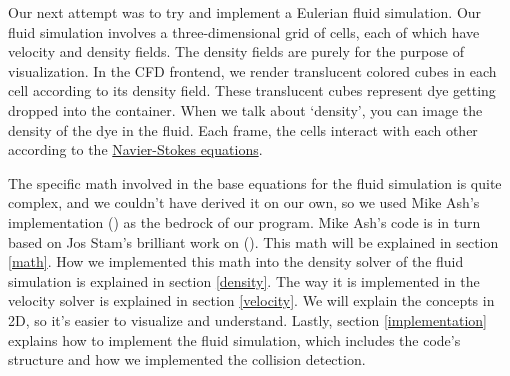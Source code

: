 \documentclass[a4paper,12pt,titlepage]{article}
\begin{document}
\noindent
\begin{minipage}[t]{0.65\textwidth}
	Our next attempt was to try and implement a Eulerian fluid simulation.
	Our fluid simulation involves a three-dimensional grid of cells, each of which
	have velocity and density fields. The density fields are purely for the purpose
	of visualization. In the CFD frontend, we render translucent colored cubes in
	each cell according to its density field. These translucent cubes represent
	dye getting dropped into the container. When we talk about `density',
	you can image the density of the dye in the fluid. Each frame, the cells
	interact with each other according to the \href{https://en.wikipedia.org/wiki/Navier%E2%80%93Stokes_equations}{Navier-Stokes equations}.
	\end{minipage}\hfill
	\begin{minipage}[t]{0.3\textwidth}
		\vspace{4pt}
		\centering{}
	\end{minipage}

The specific math involved in the base equations for the fluid simulation is
quite complex, and we couldn't have derived it on our own, so we used
Mike Ash's implementation \href{www.mikeash.com/pyblog/fluid-simulation-for-dummies.html}{} (\cite{mikeash})
as the bedrock of our program. Mike Ash's code is in turn based on Jos Stam's
brilliant work on \href{www.dgp.toronto.edu/public_user/stam/reality/Research/pdf/GDC03.pdf}{} (\cite{josstam}).
This math will be explained in section \ref{math}. 
How we implemented this math into the density solver of the fluid simulation is explained in section \ref{density}.
The way it is implemented in the velocity solver is explained in section \ref{velocity}.
We will explain the concepts in 2D, so it's easier to visualize and understand.
Lastly, section \ref{implementation} explains how to implement the fluid simulation,
which includes the code's structure and how we implemented the collision detection.
\end{document}
